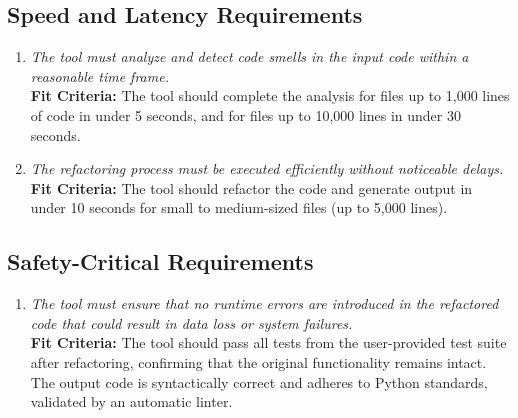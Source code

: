 \documentclass[12pt]{article}
\begin{document}
\subsection{Speed and Latency Requirements}
\begin{enumerate}[label=PR-SL \arabic*., wide=0pt, leftmargin=*]
  \item \emph{The tool must analyze and detect code smells in the input code within a reasonable time frame.}\\
  {\bf Fit Criteria:} The tool should complete the analysis for files up to 1,000 lines of code in under 5 seconds, and for files up to 10,000 lines in under 30 seconds.
  
  \item \emph{The refactoring process must be executed efficiently without noticeable delays.}\\
  {\bf Fit Criteria:} The tool should refactor the code and generate output in under 10 seconds for small to medium-sized files (up to 5,000 lines).
\end{enumerate}

\subsection{Safety-Critical Requirements}
\begin{enumerate}[label=PR-SCL \arabic*., wide=0pt, leftmargin=*]
  \item \emph{The tool must ensure that no runtime errors are introduced in the refactored code that could result in data loss or system failures.}\\
  {\bf Fit Criteria:} The tool should pass all tests from the user-provided test suite after refactoring, confirming that the original functionality remains intact. The output code is syntactically correct and adheres to Python standards, validated by an automatic linter.
\end{enumerate}
\end{document}
